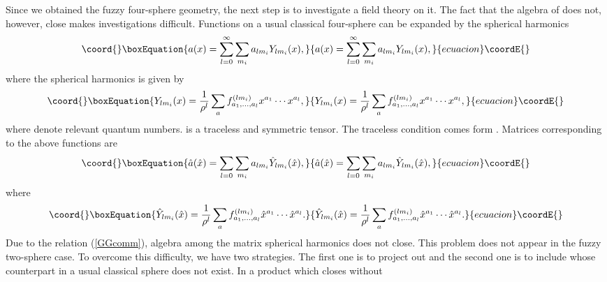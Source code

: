 \documentclass[a4paper,11pt]{article}
\begin{document}
\vspace{0.5cm} 
Since we obtained the fuzzy four-sphere geometry, 
the next step is to investigate a field theory 
on it. 
The fact that the algebra of \coordHE{} 
does not, however, close makes investigations difficult.  
Functions on a usual classical four-sphere can be expanded by the 
spherical harmonics 
\begin{equation}\coord{}\boxEquation{
a(x)=\sum_{l=0}^{\infty}\sum_{m_{i}}
a_{lm_{i}}Y_{lm_{i}}(x), 
}{
a(x)=\sum_{l=0}^{\infty}\sum_{m_{i}}
a_{lm_{i}}Y_{lm_{i}}(x), 
}{ecuacion}\coordE{}\end{equation}
where the spherical harmonics is given by 
\begin{equation}\coord{}\boxEquation{
Y_{lm_{i}}(x)=\frac{1}{\rho^{l}}
\sum_{a}f_{a_{1},\ldots,a_{l}}^{(lm_{i})}
x^{a_{1}}\cdots x^{a_{l}}, 
}{
Y_{lm_{i}}(x)=\frac{1}{\rho^{l}}
\sum_{a}f_{a_{1},\ldots,a_{l}}^{(lm_{i})}
x^{a_{1}}\cdots x^{a_{l}}, 
}{ecuacion}\coordE{}\end{equation}
where \coordHE{} denote relevant quantum numbers. 
\coordHE{} is a traceless and symmetric tensor. 
The traceless condition comes form \coordHE{}. 
Matrices corresponding to the above functions are 
\begin{equation}\coord{}\boxEquation{
\hat{a}(\hat{x})=\sum_{l=0}\sum_{m_{i}}
a_{lm_{i}}\hat{Y}_{lm_{i}}(\hat{x}), 
}{
\hat{a}(\hat{x})=\sum_{l=0}\sum_{m_{i}}
a_{lm_{i}}\hat{Y}_{lm_{i}}(\hat{x}), 
}{ecuacion}\coordE{}\end{equation}
where 
\begin{equation}\coord{}\boxEquation{
\hat{Y}_{lm_{i}}(\hat{x})=\frac{1}{\rho^{l}}
\sum_{a}f_{a_{1},\ldots,a_{l}}^{(lm_{i})}
\hat{x}^{a_{1}}\cdots \hat{x}^{a_{l}}. 
\label{classicalharmonics}
}{
\hat{Y}_{lm_{i}}(\hat{x})=\frac{1}{\rho^{l}}
\sum_{a}f_{a_{1},\ldots,a_{l}}^{(lm_{i})}
\hat{x}^{a_{1}}\cdots \hat{x}^{a_{l}}. 
}{ecuacion}\coordE{}\end{equation}
Due to the relation (\ref{GGcomm}), 
algebra among the matrix spherical harmonics 
does not close. 
This problem does not appear in the fuzzy two-sphere case. 
To overcome this difficulty, we have two strategies. 
The first one is to project out \coordHE{}\cite{ramgoo} 
and 
the second one is to include \coordHE{} whose 
counterpart in a usual classical sphere does not exist. 
In \cite{ramgoo} a product which closes without \coordHE{} 
\end{document}
